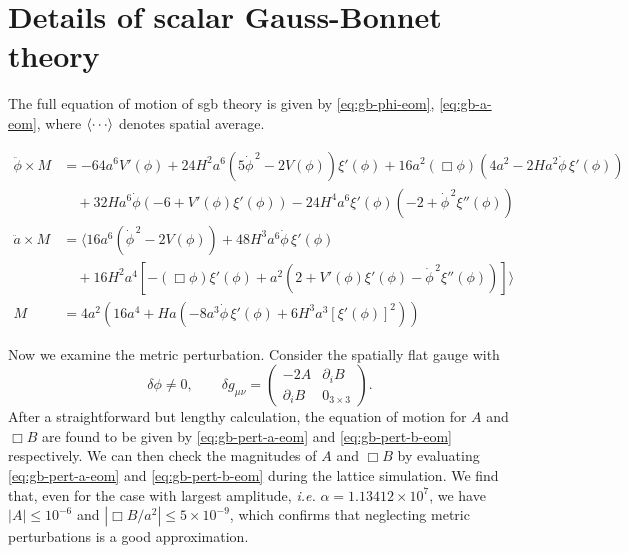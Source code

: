 \documentclass[reprint, 10pt, amsmath, amssymb, floatfix, aps, prd, superscriptaddress, nofootinbib, nobibnotes,twocolumn]{revtex4-1}
\begin{document}
\section{Details of scalar Gauss-Bonnet theory}
\label{sec:ap:gb-details}
The full equation of motion of \ac{sgb} theory is given by \eqref{eq:gb-phi-eom}, \eqref{eq:gb-a-eom}, where $\braket{\cdots}$ denotes spatial average.
\begin{widetext}
    \begin{align}
        \ddot{\phi} \times M &= -64a^6V'(\phi)+24H^2a^6\left(5\dot{\phi}^{\,2}-2V(\phi)\right)\xi'(\phi)+16a^2(\Box\phi)\left(4a^2-2Ha^2\dot{\phi}\,\xi'(\phi)\right)
        \nonumber\\
        &\quad+32Ha^6\dot{\phi}\left(-6+ V'(\phi)\xi'(\phi)\right)-24H^4a^6\xi'(\phi)\left(-2+\dot{\phi}^{\,2}\xi''(\phi)\right)\label{eq:gb-phi-eom}\\
        \ddot a \times M & = \Big\langle 16a^6\left(\dot{\phi}^{\,2}-2V(\phi)\right)+48H^3a^6\dot{\phi}\,\xi'(\phi)
        \nonumber\\
        &\quad+16H^2a^4\left[-(\Box\phi)\xi'(\phi)+a^2\left(2+ V'(\phi)\xi'(\phi)-\dot{\phi}^{\,2}\xi''(\phi)\right)\right]\Big\rangle\label{eq:gb-a-eom}\\
        M & = 4a^2\left(16a^4+H a\left(-8a^3\dot{\phi}\,\xi'(\phi)+6H^3a^3\left[\xi'(\phi)\right]^2\right)\right)
    \end{align}
\end{widetext}
Now we examine the metric perturbation. Consider the spatially flat gauge with
\begin{equation}
    \delta\phi \ne 0, \qquad \delta g_{\mu\nu} = \begin{pmatrix}
        -2A & \partial_i B\\
        \partial_i B & 0_{3 \times 3}
    \end{pmatrix}.
\end{equation}
After a straightforward but lengthy calculation, the equation of motion for $A$ and $\Box B$ are found to be given by \eqref{eq:gb-pert-a-eom} and \eqref{eq:gb-pert-b-eom} respectively. We can then check the magnitudes of $A$ and $\Box B$ by evaluating \eqref{eq:gb-pert-a-eom} and \eqref{eq:gb-pert-b-eom} during the lattice simulation. We find that, even for the case with largest amplitude, \textit{i.e.} $\alpha = 1.13412 \times 10^7$, we have $|A| \leqslant 10^{-6}$ and $|\Box B / a^2| \leqslant 5 \times 10^{-9}$, which confirms that neglecting metric perturbations is a good approximation.
\end{document}

